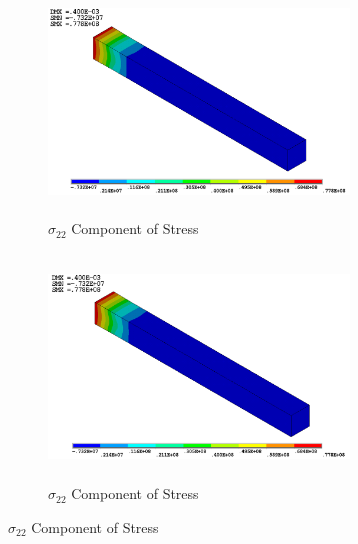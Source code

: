 \documentclass[12pt,a4paper,twoside,openright]{report}
\begin{document}
\begin{figure}[htbp!]\ContinuedFloat     
     \begin{subfigure}[b]{0.4\textwidth}
        \includegraphics[width=8cm,height=6cm]{16.Ansys_SY.png}
         \caption{ $\sigma_{22}$ Component of Stress}
         \label{fig:Y Component of Stress}
     \end{subfigure}
    \hspace{1.8cm}
      \begin{subfigure}[b]{0.4\textwidth}
         \includegraphics[width=8cm,height=6cm]{19.User_SY.png}
         \caption{ $\sigma_{22}$ Component of Stress}
         \label{fig:Y Component of Stress2}
     \end{subfigure}
\end{figure}
\FloatBarrier
\end{document}
